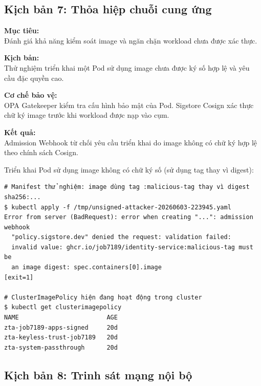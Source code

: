 \subsection{Kịch bản 7: Thỏa hiệp chuỗi cung ứng}
\label{subsec:kb7_supply_chain}

\textbf{Mục tiêu:}\\
Đánh giá khả năng kiểm soát image và ngăn chặn workload chưa được xác thực.

\textbf{Kịch bản:}\\
Thử nghiệm triển khai một Pod sử dụng image chưa được ký số hợp lệ và yêu cầu đặc quyền cao.

\textbf{Cơ chế bảo vệ:}\\
OPA Gatekeeper kiểm tra cấu hình bảo mật của Pod. Sigstore Cosign xác thực chữ ký image trước khi workload được nạp vào cụm.

\textbf{Kết quả:}\\
Admission Webhook từ chối yêu cầu triển khai do image không có chữ ký hợp lệ theo chính sách Cosign.


Triển khai Pod sử dụng image không có chữ ký số (sử dụng tag thay vì digest):
\begin{listing}[H]
\begin{verbatim}
# Manifest thử nghiệm: image dùng tag :malicious-tag thay vì digest sha256:...
$ kubectl apply -f /tmp/unsigned-attacker-20260603-223945.yaml
Error from server (BadRequest): error when creating "...": admission webhook
  "policy.sigstore.dev" denied the request: validation failed:
  invalid value: ghcr.io/job7189/identity-service:malicious-tag must be
  an image digest: spec.containers[0].image
[exit=1]

# ClusterImagePolicy hiện đang hoạt động trong cluster
$ kubectl get clusterimagepolicy
NAME                        AGE
zta-job7189-apps-signed     20d
zta-keyless-trust-job7189   20d
zta-system-passthrough      20d
\end{verbatim}
\caption{Admission Webhook từ chối Image không sử dụng digest --- chính sách yêu cầu image phải được tham chiếu qua digest sha256}
\label{lst:kb7_cosign_cmd}
\end{listing}


\subsection{Kịch bản 8: Trinh sát mạng nội bộ}
\label{subsec:kb8_discovery}

